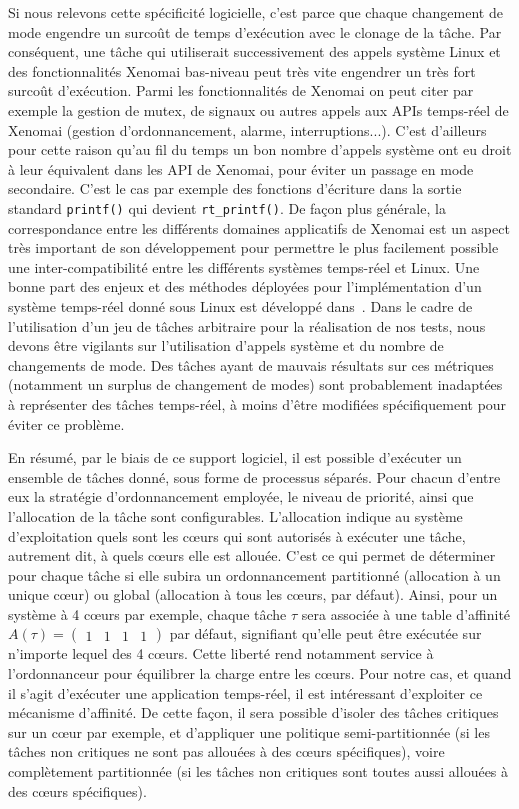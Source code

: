 \documentclass[french, a4paper, 11pt, twoside, pdftex]{StyleThese}
\begin{document}
		Si nous relevons cette spécificité logicielle, c'est parce que chaque changement de mode engendre un surcoût de temps d'exécution avec le clonage de la tâche. Par conséquent, une tâche qui utiliserait successivement des appels système Linux et des fonctionnalités Xenomai bas-niveau peut très vite engendrer un très fort surcoût d'exécution. Parmi les fonctionnalités de Xenomai on peut citer par exemple la gestion de mutex, de signaux ou autres appels aux APIs temps-réel de Xenomai (gestion d'ordonnancement, alarme, interruptions...). C'est d'ailleurs pour cette raison qu'au fil du temps un bon nombre d'appels système ont eu droit à leur équivalent dans les API de Xenomai, pour éviter un passage en mode secondaire. C'est le cas par exemple des fonctions d'écriture dans la sortie standard \texttt{printf()} qui devient \texttt{rt\_printf()}. De façon plus générale, la correspondance entre les différents domaines applicatifs de Xenomai est un aspect très important de son développement pour permettre le plus facilement possible une inter-compatibilité entre les différents systèmes temps-réel et Linux. Une bonne part des enjeux et des méthodes déployées pour l'implémentation d'un système temps-réel donné sous Linux est développé dans~\cite{gerum_xenomai_2015}. 
	    Dans le cadre de l'utilisation d'un jeu de tâches arbitraire pour la réalisation de nos tests, nous devons être vigilants sur l'utilisation d'appels système et du nombre de changements de mode. Des tâches ayant de mauvais résultats sur ces métriques (notamment un surplus de changement de modes) sont probablement inadaptées à représenter des tâches temps-réel, à moins d'être modifiées spécifiquement pour éviter ce problème. 
		\smallbreak
		
        En résumé, par le biais de ce support logiciel, il est possible d'exécuter un ensemble de tâches donné, sous forme de processus séparés. Pour chacun d'entre eux la stratégie d'ordonnancement employée, le niveau de priorité, ainsi que l'allocation de la tâche sont configurables. L'allocation indique au système d'exploitation quels sont les cœurs qui sont autorisés à exécuter une tâche, autrement dit, à quels cœurs elle est allouée. C'est ce qui permet de déterminer pour chaque tâche si elle subira un ordonnancement partitionné (allocation à un unique cœur) ou global (allocation à tous les cœurs, par défaut).  Ainsi, pour un système à 4 cœurs par exemple, chaque tâche $\tau$ sera associée à une table d'affinité $A(\tau) = \begin{pmatrix}1 & 1 & 1 & 1\end{pmatrix}$ par défaut, signifiant qu'elle peut être exécutée sur n'importe lequel des 4 cœurs. Cette liberté rend notamment service à l'ordonnanceur pour équilibrer la charge entre les cœurs. Pour notre cas, et quand il s'agit d'exécuter une application temps-réel, il est intéressant d'exploiter ce mécanisme d'affinité. De cette façon, il sera possible d'isoler des tâches critiques sur un cœur par exemple, et d'appliquer une politique semi-partitionnée (si les tâches non critiques ne sont pas allouées à des cœurs spécifiques), voire complètement partitionnée (si les tâches non critiques sont toutes aussi allouées à des cœurs spécifiques).
        
\end{document}
